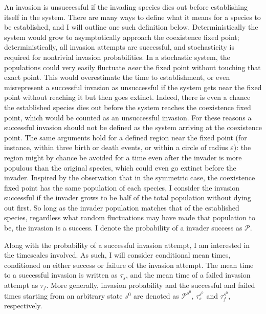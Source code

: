 An invasion is unsuccessful if the invading species dies out before establishing itself in the system. 
There are many ways to define what it means for a species to be established, and I will outline one such definition below. 
Deterministically the system would grow to asymptotically approach the coexistence fixed point; deterministically, all invasion attempts are successful, and stochasticity is required for nontrivial invasion probabilities. 
In a stochastic system, the populations could very easily fluctuate \emph{near} the fixed point without touching that exact point. This would overestimate the time to establishment, or even misrepresent a successful invasion as unsuccessful if the system gets near the fixed point without reaching it but then goes extinct. 
Indeed, there is even a chance the established species dies out before the system reaches the coexistence fixed point, which would be counted as an unsuccessful invasion. 
For these reasons a successful invasion should not be defined as the system arriving at the coexistence point. 
The same arguments hold for a defined region near the fixed point (for instance, within three birth or death events, or within a circle of radius $\varepsilon$): the region might by chance be avoided for a time even after the invader is more populous than the original species, which could even go extinct before the invader. 
Inspired by the observation that in the symmetric case, the coexistence fixed point has the same population of each species, I consider the invasion successful if the invader grows to be half of the total population without dying out first. 
So long as the invader population matches that of the established species, regardless what random fluctuations may have made that population to be, the invasion is a success. %
I denote the probability of a invader success as $\mathcal{P}$. 

Along with the probability of a successful invasion attempt, I am interested in the timescales involved. 
As such, I will consider conditional mean times, conditioned on either success or failure of the invasion attempt. 
The mean time to a successful invasion is written as $\tau_s$, and the mean time of a failed invasion attempt as $\tau_f$. 
More generally, invasion probability and the successful and failed times starting from an arbitrary state $s^0$ are denoted as $\mathcal{P}^{s^0}$, $\tau_s^{s^0}$ and $\tau_f^{s^0}$, respectively. 


